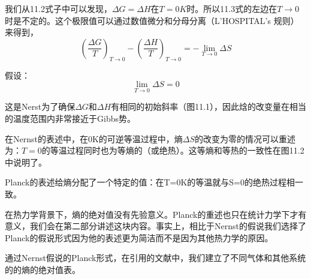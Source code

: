 我们从11.2式子中可以发现，$\Delta G= \Delta H$在$T=0K$时。所以11.3式的左边在$T\rightarrow 0$时是不定的。这个极限值可以通过数值微分和分母分离（L'HOSPITAL's 规则）来得到，
\begin{equation}
	(\frac{\Delta G}{T})_{T\rightarrow 0}-(\frac{\Delta H}{T})_{T\rightarrow 0}=- \lim\limits_{T\rightarrow 0} \Delta S	
\end{equation}

假设：
\begin{equation}
	\lim\limits_{T\rightarrow 0} \Delta S=0
\end{equation}

这是Nerst为了确保$\Delta G$和$\Delta H$有相同的初始斜率（图11.1），因此焓的改变量在相当的温度范围内非常接近于Gibbs势。

在Nernst的表述中，在0K的可逆等温过程中，熵$\Delta S$的改变为零的情况可以重述为：$T=0$的等温过程同时也为等熵的（或绝热）。这等熵和等热的一致性在图11.2中说明了。

Planck的表述给熵分配了一个特定的值：在T=0K的等温就与S=0的绝热过程相一致。

在热力学背景下，熵的绝对值没有先验意义。Planck的重述也只在统计力学下才有意义，我们会在第二部分讲述这块内容。事实上，相比于Nernst的假说我们选择了Planck的假说形式因为他的表述更为简洁而不是因为其他热力学的原因。

通过Nernst假说的Planck形式，在引用的文献中，我们建立了不同气体和其他系统的的熵的绝对值表。
$$$$$$$$